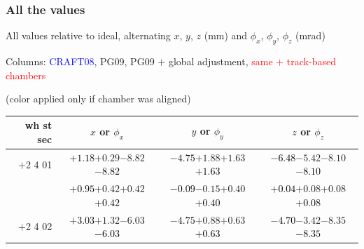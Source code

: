 \documentclass[compress]{beamer}
\begin{document}
\begin{frame}
\frametitle{All the values}
\tiny

All values relative to ideal, alternating $x$, $y$, $z$ (mm) and $\phi_x$, $\phi_y$, $\phi_z$ (mrad)

Columns: \textcolor{blue}{CRAFT08}, PG09, PG09 $+$ global adjustment, \textcolor{red}{same $+$ track-based chambers}

\hfill (color applied only if chamber was aligned)

\vfill
\renewcommand{\arraystretch}{1.1}
\begin{tabular}{r | c | c | c}
wh st sec & $x$ or $\phi_x$ & $y$ or $\phi_y$ & $z$ or $\phi_z$ \\\hline
$+$2 4 01 & \textcolor{black}{$+1.18$}\hspace{0.1 cm}$+0.29$\hspace{0.1 cm}$-8.82$\hspace{0.1 cm}\textcolor{black}{$-8.82$} & \textcolor{black}{$-4.75$}\hspace{0.1 cm}$+1.88$\hspace{0.1 cm}$+1.63$\hspace{0.1 cm}\textcolor{black}{$+1.63$} & \textcolor{black}{$-6.48$}\hspace{0.1 cm}$-5.42$\hspace{0.1 cm}$-8.10$\hspace{0.1 cm}\textcolor{black}{$-8.10$} \\
          & \textcolor{black}{$+0.95$}\hspace{0.1 cm}$+0.42$\hspace{0.1 cm}$+0.42$\hspace{0.1 cm}\textcolor{black}{$+0.42$} & \textcolor{black}{$-0.09$}\hspace{0.1 cm}$-0.15$\hspace{0.1 cm}$+0.40$\hspace{0.1 cm}\textcolor{black}{$+0.40$} & \textcolor{black}{$+0.04$}\hspace{0.1 cm}$+0.08$\hspace{0.1 cm}$+0.08$\hspace{0.1 cm}\textcolor{black}{$+0.08$} \\
$+$2 4 02 & \textcolor{black}{$+3.03$}\hspace{0.1 cm}$+1.32$\hspace{0.1 cm}$-6.03$\hspace{0.1 cm}\textcolor{black}{$-6.03$} & \textcolor{black}{$-4.75$}\hspace{0.1 cm}$+0.88$\hspace{0.1 cm}$+0.63$\hspace{0.1 cm}\textcolor{black}{$+0.63$} & \textcolor{black}{$-4.70$}\hspace{0.1 cm}$-3.42$\hspace{0.1 cm}$-8.35$\hspace{0.1 cm}\textcolor{black}{$-8.35$} \\

\end{tabular}
\end{frame}
\end{document}
